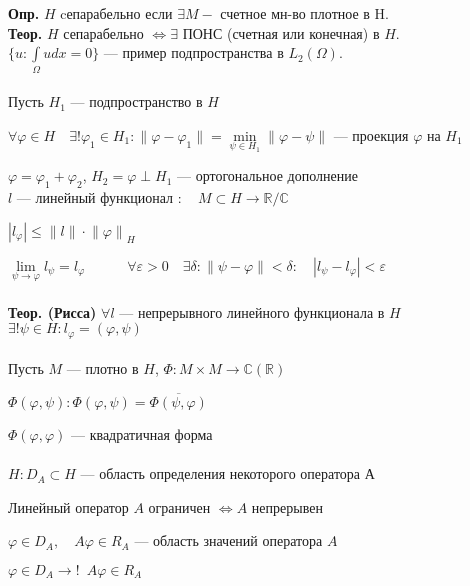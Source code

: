 \textbf{Опр.} $H$ cепарабельно если $ \exists M - $ счетное мн-во плотное в H. \\

\textbf{Теор.} $H$ сепарабельно $ \Leftrightarrow \exists $ ПОНС (счетная или конечная) в $H$. \\

$ \{ u: \int\limits_{\Omega}^{} u dx = 0 \} $ --- пример подпространства в $ L_2(\Omega) $. \\ \\

Пусть $ H_1 $ --- подпространство в $H$

$ \forall \varphi \in H \quad \exists ! \varphi_1 \in H_1: \| \varphi - \varphi_1 \| = \underset{\psi \in H_1}{\min}  \| \varphi - \psi \| $ --- проекция $\varphi$ на $H_1$

$ \varphi = \varphi_1 + \varphi_2 $, \quad \quad $ H_2 = \varphi \perp H_1 $ --- ортогональное дополнение \\

$l$ --- линейный функционал $: \quad M \subset H \rightarrow \mathbb{R}/\mathbb{C} $

$ |l_{\varphi}| \leq \|l\| \cdot {\|\varphi\|}_H $

$ \underset{\psi \rightarrow \varphi}{\lim} l_\psi = l_\varphi \quad \quad \quad \forall \varepsilon > 0 \quad \exists \delta: \| \psi - \varphi \| < \delta: \quad |l_\psi - l_\varphi| < \varepsilon$ \\ \\

\textbf{Теор. (Рисса)} $ \forall l $ --- непрерывного линейного функционала в $H$ $\exists! \psi \in H:  l_\varphi = (\varphi, \psi)$ \\ \\


Пусть $M$ --- плотно в $H$, \quad $\Phi: M \times M \rightarrow \mathbb{C} (\mathbb{R})  $

$ \Phi(\varphi, \psi): \Phi(\varphi, \psi) = \overline{\Phi(\psi, \varphi)} $

$ \Phi(\varphi, \varphi) $ --- квадратичная форма \\ \\


$ H: D_A \subset H $ --- область определения некоторого оператора А

Линейный оператор $A$ ограничен $\Leftrightarrow A$ непрерывен

$\varphi \in D_A, \quad A\varphi \in R_A$ --- область значений оператора $A$

$\varphi \in D_A \rightarrow ! \enspace A\varphi \in R_A$

\newpage